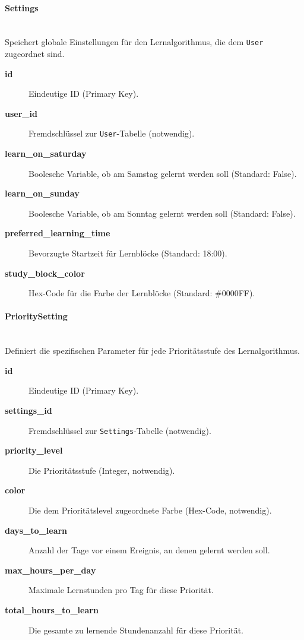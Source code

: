 \documentclass[12pt,a4paper]{report}
\newcommand{\myparagraph}[1]{\paragraph{#1}\mbox{}\\}
\begin{document}
\myparagraph{Settings}
Speichert globale Einstellungen für den Lernalgorithmus, die dem \texttt{User} zugeordnet sind.
\begin{description}
    \item[\textbf{id}] Eindeutige ID (Primary Key).
    \item[\textbf{user\_id}] Fremdschlüssel zur \texttt{User}-Tabelle (notwendig).
    \item[\textbf{learn\_on\_saturday}] Boolesche Variable, ob am Samstag gelernt werden soll (Standard: False).
    \item[\textbf{learn\_on\_sunday}] Boolesche Variable, ob am Sonntag gelernt werden soll (Standard: False).
    \item[\textbf{preferred\_learning\_time}] Bevorzugte Startzeit für Lernblöcke (Standard: 18:00).
    \item[\textbf{study\_block\_color}] Hex-Code für die Farbe der Lernblöcke (Standard: \#0000FF).
\end{description}

\myparagraph{PrioritySetting}
Definiert die spezifischen Parameter für jede Prioritätsstufe des Lernalgorithmus.
\begin{description}
    \item[\textbf{id}] Eindeutige ID (Primary Key).
    \item[\textbf{settings\_id}] Fremdschlüssel zur \texttt{Settings}-Tabelle (notwendig).
    \item[\textbf{priority\_level}] Die Prioritätsstufe (Integer, notwendig).
    \item[\textbf{color}] Die dem Prioritätslevel zugeordnete Farbe (Hex-Code, notwendig).
    \item[\textbf{days\_to\_learn}] Anzahl der Tage vor einem Ereignis, an denen gelernt werden soll.
    \item[\textbf{max\_hours\_per\_day}] Maximale Lernstunden pro Tag für diese Priorität.
    \item[\textbf{total\_hours\_to\_learn}] Die gesamte zu lernende Stundenanzahl für diese Priorität.
\end{description}
\end{document}

